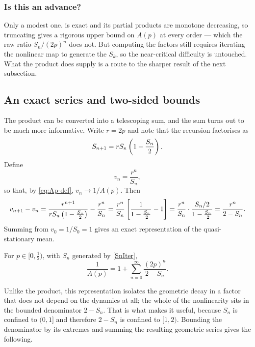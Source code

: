 \subsubsection*{Is this an advance?}

Only a modest one.  is exact and its partial products are
monotone decreasing, so truncating gives a rigorous upper bound on $A(p)$ at every
order --- which the raw ratio $S_n/(2p)^n$ does not. But computing the factors still
requires iterating the nonlinear map to generate the $S_k$, so the near-critical
difficulty is untouched. What the product does supply is a route to the sharper
result of the next subsection.

\subsection{An exact series and two-sided bounds}
\label{sec:Abounds}

The product can be converted into a telescoping sum, and the sum turns out to be
much more informative. Write $r=2p$ and note that the recursion factorises as
\begin{equation*}
S_{n+1} = rS_n\left(1-\frac{S_n}{2}\right) .
\end{equation*}
Define
\begin{equation*}
v_n = \frac{r^n}{S_n},
\end{equation*}
so that, by \cref{eq:Ap-def}, $v_n\to1/A(p)$. Then
\begin{equation*}
v_{n+1}-v_n
= \frac{r^{n+1}}{rS_n\left(1-\frac{S_n}{2}\right)} - \frac{r^n}{S_n}
= \frac{r^n}{S_n}\left[\frac{1}{1-\frac{S_n}{2}}-1\right]
= \frac{r^n}{S_n}\cdot\frac{S_n/2}{1-\frac{S_n}{2}}
= \frac{r^n}{2-S_n}.
\end{equation*}
Summing from $v_0 = 1/S_0 = 1$ gives an exact representation of the quasi-stationary
mean.

\begin{proposition}
\label{prop:series}
For $p\in[0,\tfrac12)$, with $S_n$ generated by \cref{SnIter},
\begin{equation}
\label{eq:Aseries}
\frac{1}{A(p)} = 1 + \sum_{n=0}^{\infty}\frac{(2p)^n}{2-S_n}.
\end{equation}
\end{proposition}

\noindent
Unlike the product, this representation isolates the geometric decay in a factor
that does not depend on the dynamics at all; the whole of the nonlinearity sits in
the bounded denominator $2-S_n$. That is what makes it useful, because $S_n$ is
confined to $(0,1]$ and therefore $2-S_n$ is confined to $[1,2)$. Bounding the
denominator by its extremes and summing the resulting geometric series gives the
following.

